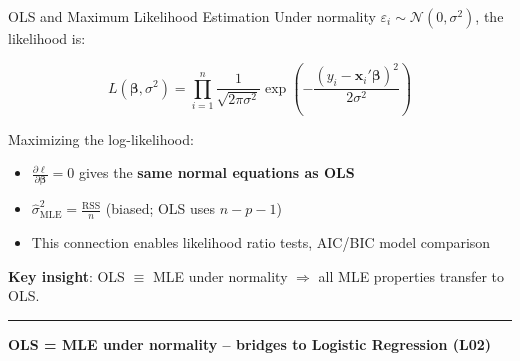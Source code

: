 \documentclass[8pt,aspectratio=169]{beamer}
\newcommand{\bottomnote}[1]{%
\vfill
\vspace{-2mm}
\textcolor{mllavender2}{\rule{\textwidth}{0.4pt}}
\vspace{1mm}
\footnotesize
\textbf{#1}
}
\begin{document}
\begin{frame}[t]{OLS and Maximum Likelihood Estimation}
  Under normality $\varepsilon_i \sim \mathcal{N}(0, \sigma^2)$, the likelihood is:

  \begin{equation}
    L(\boldsymbol{\beta}, \sigma^2) = \prod_{i=1}^{n} \frac{1}{\sqrt{2\pi\sigma^2}} \exp\!\left(-\frac{(y_i - \mathbf{x}_i'\boldsymbol{\beta})^2}{2\sigma^2}\right)
  \end{equation}

  Maximizing the log-likelihood:

  \begin{itemize}
    \item $\frac{\partial \ell}{\partial \boldsymbol{\beta}} = 0$ gives the \textbf{same normal equations as OLS}
    \item $\hat{\sigma}^2_{\text{MLE}} = \frac{\text{RSS}}{n}$ (biased; OLS uses $n - p - 1$)
    \item This connection enables likelihood ratio tests, AIC/BIC model comparison
  \end{itemize}

  \textbf{Key insight}: OLS $\equiv$ MLE under normality $\Rightarrow$ all MLE properties transfer to OLS.

  \bottomnote{OLS = MLE under normality -- bridges to Logistic Regression (L02)}
\end{frame}
\end{document}
